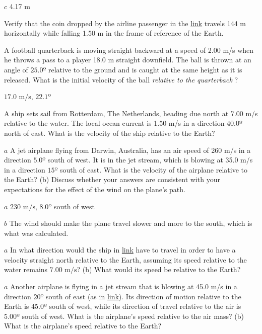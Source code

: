 \documentclass[
]{book}
\newenvironment{problems-exercises}{}{}
\begin{document}
\begin{problems-exercises}
\(c\) 4.17 m

\hypertarget{fs-id1543938}{}
\leavevmode\hypertarget{fs-id1543939}{}%
Verify that the coin dropped by the airline passenger in the
\protect\hyperlink{fs-id1890300}{link} travels 144 m horizontally
while falling 1.50 m in the frame of reference of the Earth.

\hypertarget{fs-id1678133}{}
\leavevmode\hypertarget{fs-id1924856}{}%
A football quarterback is moving straight backward at a speed of 2.00
m/s when he throws a pass to a player 18.0 m straight downfield. The
ball is thrown at an angle of \(25.0º\) relative to the ground and is
caught at the same height as it is released. What is the initial
velocity of the ball \emph{relative to the quarterback} ?

\leavevmode\hypertarget{fs-id2134144}{}%
\({17\text{.}\text{0\ m/s}}{}\), \({\text{22}\text{.}1º}{}\)

\hypertarget{fs-id1545568}{}
\leavevmode\hypertarget{fs-id1545569}{}%
A ship sets sail from Rotterdam, The Netherlands, heading due north at
7.00 m/s relative to the water. The local ocean current is 1.50 m/s in a
direction \(\text{40.0º}{}\) north of east. What is the velocity of the
ship relative to the Earth?

\hypertarget{eip-741}{}
\leavevmode\hypertarget{eip-689}{}%
\(a\) A jet airplane flying from Darwin, Australia, has an air speed of
260 m/s in a direction \(5.0º{}\) south of west. It is in the jet stream,
which is blowing at 35.0 m/s in a direction \(15º{}\) south of east. What
is the velocity of the airplane relative to the Earth? (b) Discuss
whether your answers are consistent with your expectations for the
effect of the wind on the plane's path.

\leavevmode\hypertarget{eip-295}{}%
\(a\) \({2\text{30\ m/s}}{}\), \(8.0º{}\) south of west

\(b\) The wind should make the plane travel slower and more to the
south, which is what was calculated.

\hypertarget{fs-id1845552}{}
\leavevmode\hypertarget{fs-id1845553}{}%
\(a\) In what direction would the ship in
\protect\hyperlink{fs-id1545568}{link} have to travel in order to
have a velocity straight north relative to the Earth, assuming its speed
relative to the water remains \({7\text{.}\text{00\ m/s}}{}\)? (b) What
would its speed be relative to the Earth?

\hypertarget{fs-id1545174}{}
\leavevmode\hypertarget{fs-id1545175}{}%
\(a\) Another airplane is flying in a jet stream that is blowing at 45.0
m/s in a direction \(\text{20º}{}\) south of east (as in
\protect\hyperlink{eip-741}{link}). Its direction of motion
relative to the Earth is \(45.0º{}\) south of west, while its direction of
travel relative to the air is \(5.00º{}\) south of west. What is the
airplane's speed relative to the air mass? (b) What is the airplane's
speed relative to the Earth?


\end{problems-exercises}
\end{document}
